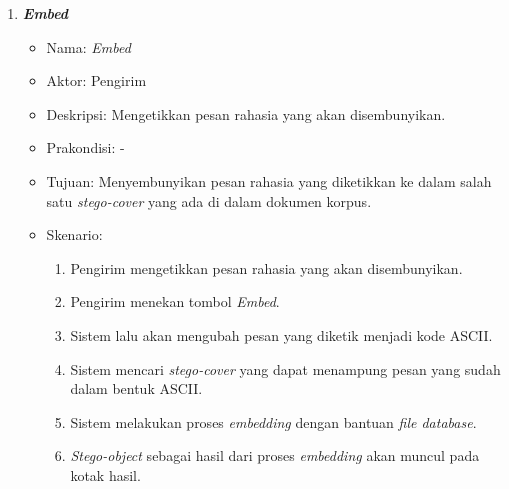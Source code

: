 \begin{enumerate}
	\item \textbf{\textit{Embed}}
	\begin{itemize}
		\item Nama: \textit{Embed}
		\item Aktor: Pengirim
		\item Deskripsi: Mengetikkan pesan rahasia yang akan disembunyikan.
		\item Prakondisi: -
		\item Tujuan: Menyembunyikan pesan rahasia yang diketikkan ke dalam salah satu \textit{stego-cover} yang ada di dalam dokumen korpus.
		\item Skenario:
			\begin{enumerate}
				\item Pengirim mengetikkan pesan rahasia yang akan disembunyikan.
				\item Pengirim menekan tombol \textit{Embed}.
				\item Sistem lalu akan mengubah pesan yang diketik menjadi kode ASCII.
				\item Sistem mencari \textit{stego-cover} yang dapat menampung pesan yang sudah dalam bentuk ASCII.
				\item Sistem melakukan proses \textit{embedding} dengan bantuan \textit{file database}.
				\item \textit{Stego-object} sebagai hasil dari proses \textit{embedding} akan muncul pada kotak hasil.
			\end{enumerate}
	\end{itemize}
	

\end{enumerate}
